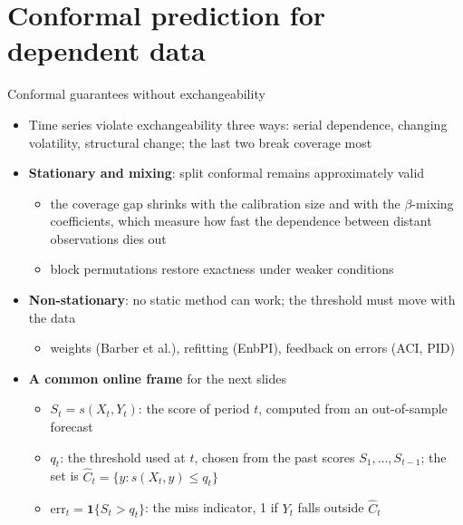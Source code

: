 \section{Conformal prediction for dependent data}

\begin{frame}{Conformal guarantees without exchangeability}
\itemsize{\small}
\begin{itemize}
    \item Time series violate exchangeability three ways: serial dependence, changing volatility, structural change; the last two break coverage most
    \item \textbf{Stationary and mixing}: split conformal remains approximately valid 
    \begin{itemize}
        \item the coverage gap shrinks with the calibration size and with the $\beta$-mixing coefficients, which measure how fast the dependence between distant observations dies out
        \item block permutations restore exactness under weaker conditions 
    \end{itemize}
    \item \textbf{Non-stationary}: no static method can work; the threshold must move with the data
    \begin{itemize}
        \item weights (Barber et al.), refitting (EnbPI), feedback on errors (ACI, PID)
    \end{itemize}
    \item \textbf{A common online frame} for the next slides
    \begin{itemize}
        \item $S_t = s(X_t, Y_t)$: the score of period $t$, computed from an out-of-sample forecast
        \item $q_t$: the threshold used at $t$, chosen from the past scores $S_1, \dots, S_{t-1}$; the set is $\hat C_t = \{y: s(X_t, y) \le q_t\}$
        \item $\mathrm{err}_t = \mathbf 1\{S_t > q_t\}$: the miss indicator, 1 if $Y_t$ falls outside $\hat C_t$
    \end{itemize}
\end{itemize}
\end{frame}

